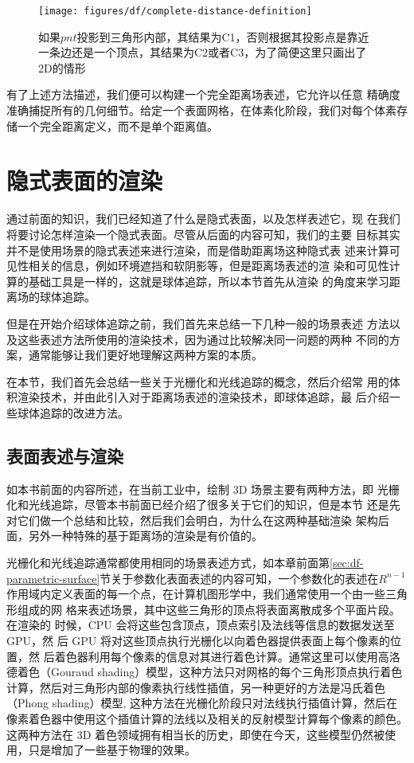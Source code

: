 \begin{figure}
	\sidecaption
	\texttt{[image: figures/df/complete-distance-definition]}
	\caption{如果$pnt$投影到三角形内部，其结果为C1，否则根据其投影点是靠近一条边还是一个顶点，其结果为C2或者C3，为了简便这里只画出了2D的情形}
	\label{f:df-complete-distance-definition}
\end{figure}

有了上述方法描述，我们便可以构建一个完全距离场表述，它允许以任意 精确度准确捕捉所有的几何细节。给定一个表面网格，在体素化阶段，我们对每个体素存储一个完全距离定义，而不是单个距离值。




\section{隐式表面的渲染}\label{sec:df-rendering-of-implicit}
通过前面的知识，我们已经知道了什么是隐式表面，以及怎样表述它，现 在我们将要讨论怎样渲染一个隐式表面。尽管从后面的内容可知，我们的主要 目标其实并不是使用场景的隐式表述来进行渲染，而是借助距离场这种隐式表 述来计算可见性相关的信息，例如环境遮挡和软阴影等，但是距离场表述的渲 染和可见性计算的基础工具是一样的，这就是球体追踪，所以本节首先从渲染 的角度来学习距离场的球体追踪。

但是在开始介绍球体追踪之前，我们首先来总结一下几种一般的场景表述 方法以及这些表述方法所使用的渲染技术，因为通过比较解决同一问题的两种 不同的方案，通常能够让我们更好地理解这两种方案的本质。

在本节，我们首先会总结一些关于光栅化和光线追踪的概念，然后介绍常 用的体积渲染技术，并由此引入对于距离场表述的渲染技术，即球体追踪，最 后介绍一些球体追踪的改进方法。




\subsection{表面表述与渲染}
如本书前面的内容所述，在当前工业中，绘制 3D 场景主要有两种方法，即 光栅化和光线追踪，尽管本书前面已经介绍了很多关于它们的知识，但是本节 还是先对它们做一个总结和比较，然后我们会明白，为什么在这两种基础渲染 架构后面，另外一种特殊的基于距离场的渲染是有价值的。

光栅化和光线追踪通常都使用相同的场景表述方式，如本章前面第\ref{sec:df-parametric-surface}节关于参数化表面表述的内容可知，一个参数化的表述在$R^{n−1}$作用域内定义表面的每一个点，在计算机图形学中，我们通常使用一个由一些三角形组成的网 格来表述场景，其中这些三角形的顶点将表面离散成多个平面片段。在渲染的 时候，CPU 会将这些包含顶点，顶点索引及法线等信息的数据发送至 GPU，然 后 GPU 将对这些顶点执行光栅化以向着色器提供表面上每个像素的位置，然 后着色器利用每个像素的信息对其进行着色计算。通常这里可以使用高洛德着色（Gouraud shading）模型，这种方法只对网格的每个三角形顶点执行着色计算，然后对三角形内部的像素执行线性插值，另一种更好的方法是冯氏着色（Phong shading）模型, 这种方法在光栅化阶段只对法线执行插值计算，然后在像素着色器中使用这个插值计算的法线以及相关的反射模型计算每个像素的颜色。这两种方法在 3D 着色领域拥有相当长的历史，即使在今天，这些模型仍然被使用，只是增加了一些基于物理的效果。

